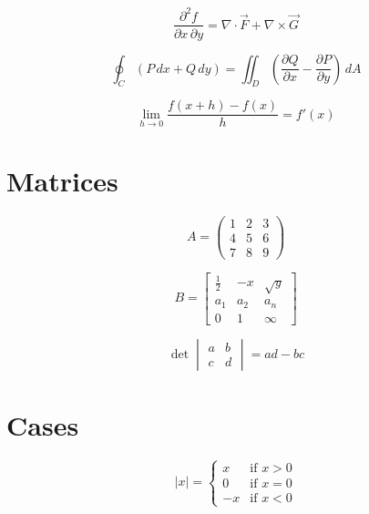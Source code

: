 \documentclass[12pt]{article}
\begin{document}
\begin{equation}
\frac{\partial^2 f}{\partial x\,\partial y}
= \nabla \cdot \vec{F} + \nabla \times \vec{G}
\end{equation}

\begin{equation}
\oint_C \left(P\,dx + Q\,dy\right)
= \iint_D \left(\frac{\partial Q}{\partial x} - \frac{\partial P}{\partial y}\right)\,dA
\end{equation}

\begin{equation}
\lim_{h \to 0}\frac{f(x+h)-f(x)}{h} = f'(x)
\end{equation}

\section{Matrices}

\begin{equation}
A = \begin{pmatrix}
1 & 2 & 3 \\
4 & 5 & 6 \\
7 & 8 & 9
\end{pmatrix}
\end{equation}

\begin{equation}
B = \begin{bmatrix}
\frac{1}{2} & -x & \sqrt{y} \\
a_1 & a_2 & a_n \\
0 & 1 & \infty
\end{bmatrix}
\end{equation}

\begin{equation}
\det \begin{vmatrix}
a & b \\
c & d
\end{vmatrix} = ad - bc
\end{equation}

\section{Cases}

\begin{equation}
|x| = \begin{cases}
x & \text{if } x > 0 \\
0 & \text{if } x = 0 \\
-x & \text{if } x < 0
\end{cases}
\end{equation}
\end{document}
